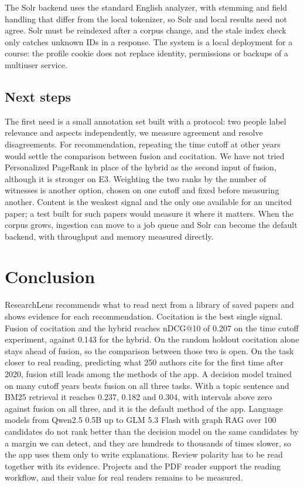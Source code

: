 \documentclass[11pt,a4paper]{article}
\begin{document}
The Solr backend uses the standard English analyzer, with stemming and field handling that differ from the local tokenizer, so Solr and local results need not agree. Solr must be reindexed after a corpus change, and the stale index check only catches unknown IDs in a response. The system is a local deployment for a course: the profile cookie does not replace identity, permissions or backups of a multiuser service.

\subsection{Next steps}
The first need is a small annotation set built with a protocol: two people label relevance and aspects independently, we measure agreement and resolve disagreements. For recommendation, repeating the time cutoff at other years would settle the comparison between fusion and cocitation. We have not tried Personalized PageRank in place of the hybrid as the second input of fusion, although it is stronger on E3. Weighting the two ranks by the number of witnesses is another option, chosen on one cutoff and fixed before measuring another. Content is the weakest signal and the only one available for an uncited paper; a test built for such papers would measure it where it matters. When the corpus grows, ingestion can move to a job queue and Solr can become the default backend, with throughput and memory measured directly.

\section{Conclusion}\label{sec:conclusion}
ResearchLens recommends what to read next from a library of saved papers and shows evidence for each recommendation. Cocitation is the best single signal. Fusion of cocitation and the hybrid reaches nDCG@10 of 0.207 on the time cutoff experiment, against 0.143 for the hybrid. On the random holdout cocitation alone stays ahead of fusion, so the comparison between those two is open. On the task closer to real reading, predicting what 250 authors cite for the first time after 2020, fusion still leads among the methods of the app. A decision model trained on many cutoff years beats fusion on all three tasks. With a topic sentence and BM25 retrieval it reaches 0.237, 0.182 and 0.304, with intervals above zero against fusion on all three, and it is the default method of the app. Language models from Qwen2.5 0.5B up to GLM 5.3 Flash with graph RAG over 100 candidates do not rank better than the decision model on the same candidates by a margin we can detect, and they are hundreds to thousands of times slower, so the app uses them only to write explanations. Review polarity has to be read together with its evidence. Projects and the PDF reader support the reading workflow, and their value for real readers remains to be measured.
\end{document}
